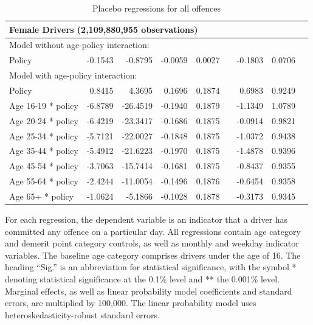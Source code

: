 \documentclass{cje}
\begin{document}
\begin{table}
\begin{tabular}{l r r r r l r r l}
\hline 

\multicolumn{8}{l}{\textbf{Female Drivers} (2,109,880,955  observations)} \\ 

\hline
\multicolumn{8}{l}{Model without age-policy interaction: } \\ 
Policy                   &  -0.1543        &  -0.8795       &  -0.0059        &  0.0027       &            &  -0.1803        &  0.0706       &            \\ 
\hline
\multicolumn{8}{l}{Model with age-policy interaction: } \\ 
Policy                   &  0.8415        &  4.3695       &  0.1696        &  0.1874       &            &  0.6983        &  0.9249       &            \\ 
Age 16-19 * policy   &  -6.8789        &  -26.4519       &  -0.1940        &  0.1879       &            &  -1.1349        &  1.0789       &            \\ 
Age 20-24 * policy   &  -6.4219        &  -23.3417       &  -0.1686        &  0.1875       &            &  -0.0914        &  0.9821       &            \\ 
Age 25-34 * policy   &  -5.7121        &  -22.0027       &  -0.1848        &  0.1875       &            &  -1.0372        &  0.9438       &            \\ 
Age 35-44 * policy   &  -5.4912        &  -21.6223       &  -0.1970        &  0.1875       &            &  -1.4878        &  0.9396       &            \\ 
Age 45-54 * policy   &  -3.7063        &  -15.7414       &  -0.1681        &  0.1875       &            &  -0.8437        &  0.9355       &            \\ 
Age 55-64 * policy   &  -2.4244        &  -11.0054       &  -0.1496        &  0.1876       &            &  -0.6454        &  0.9358       &            \\ 
Age 65+ * policy   &  -1.0624        &  -5.1866       &  -0.1028        &  0.1878       &            &  -0.3173        &  0.9345       &            \\ 

\hline 

\end{tabular} 
\caption{Placebo regressions for all offences} 
For each regression, the dependent variable is an indicator that a driver has committed  
any offence on a particular day.  
All regressions contain age category and demerit point category controls, 
as well as monthly and weekday indicator variables. 
The baseline age category comprises drivers under the age of 16. 
The heading ``Sig.'' is an abbreviation for statistical significance, with 
the symbol * denoting statistical significance at the 0.1\% level 
and ** the 0.001\% level. 
Marginal effects, as well as linear probability model coefficients and standard errors, are  
multiplied by 100,000.  
The linear probability model uses heteroskedasticity-robust standard errors. 
\label{tab:seas_Logit_vs_LPMx100K_placebo_regs} 
\end{table} 
 
\end{document}
